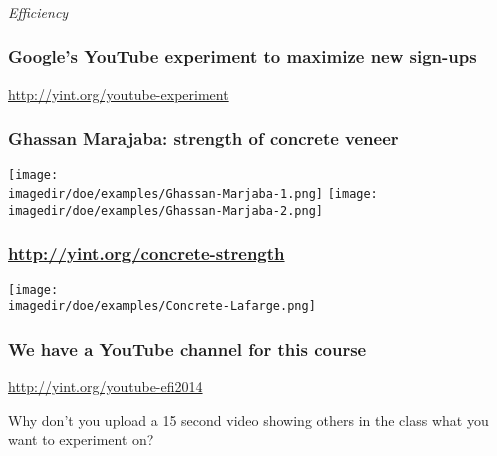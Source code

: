 %

\begin{frame}[plain]\frametitle{}
	\begin{center}
		\Huge{\emph{Efficiency}}
	\end{center}	
\end{frame}

\begin{frame}\frametitle{Google's YouTube experiment to maximize new sign-ups}
	\begin{center}
		\Huge{\href{http://yint.org/youtube-experiment}{http://yint.org/youtube-experiment}}
	\end{center}	
\end{frame}

\begin{frame}\frametitle{Ghassan Marajaba: strength of concrete veneer}
	\begin{center}
		\texttt{[image: \\imagedir/doe/examples/Ghassan-Marjaba-1.png]}
		\texttt{[image: \\imagedir/doe/examples/Ghassan-Marjaba-2.png]}
	\end{center}
\end{frame}

\begin{frame}\frametitle{\href{http://yint.org/concrete-strength}{http://yint.org/concrete-strength}}
	\begin{center}
		\texttt{[image: \\imagedir/doe/examples/Concrete-Lafarge.png]}
	\end{center}
\end{frame}

\begin{frame}\frametitle{We have a YouTube channel for this course}
	{\Huge \href{http://yint.org/youtube-efi2014}{http://yint.org/youtube-efi2014}
	
	\vspace{24pt}	
	Why don't you upload a 15 second video showing others in the class what you want to experiment on?	
	}
\end{frame}

